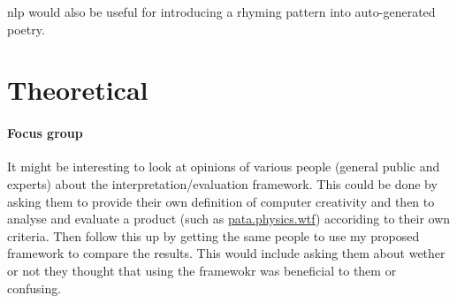 \gls{nlp} would also be useful for introducing a rhyming pattern into auto-generated poetry. 






\section{Theoretical}

\paragraph{Focus group}
It might be interesting to look at opinions of various people (general public and experts) about the interpretation/evaluation framework. This could be done by asking them to provide their own definition of computer creativity and then to analyse and evaluate a product (such as \url{pata.physics.wtf}) accoriding to their own criteria. Then follow this up by getting the same people to use my proposed framework to compare the results. This would include asking them about wether or not they thought that using the framewokr was beneficial to them or confusing.

\paragraph{}



\stopcontents[chapters]
